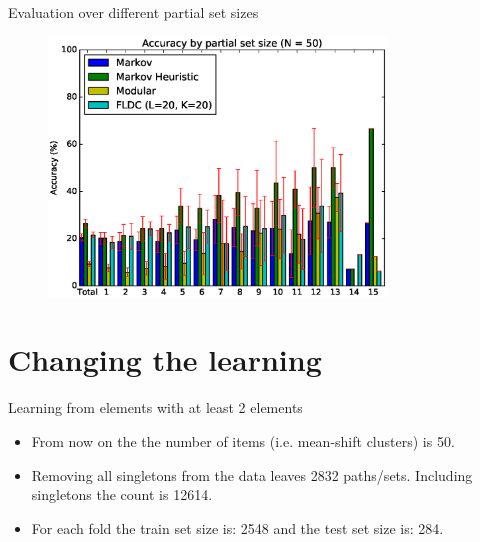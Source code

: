 \documentclass{beamer}
\begin{document}
\begin{frame}{Evaluation over different partial set sizes}
  \begin{figure}
    \centering
    \includegraphics[width=0.8\textwidth]{set_size_score_50}
  \end{figure}
\end{frame}

\section{Changing the learning}

\begin{frame}{Learning from elements with at least 2 elements}
  \begin{itemize}
    \item From now on the the number of items (i.e. mean-shift clusters) is 50.
    \item Removing all singletons from the data leaves 2832 paths/sets. Including singletons the count is 12614.
    \item For each fold the train set size is: 2548 and the test set size is: 284.
  \end{itemize}
\end{frame}
\end{document}
